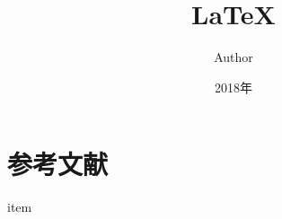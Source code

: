 \documentclass[uplatex,a4paper,11pt]{jsarticle}
\title{\LaTeX}
\author{Author}
\date{2018年}
\begin{document}
\setlength{\abovedisplayskip}{-7pt}
\setlength{\belowdisplayskip}{5pt}
\maketitle


\section{参考文献}\vspace{-3zh}
\begin{thebibliography}{99}
 item
\end{thebibliography}
\end{document}
